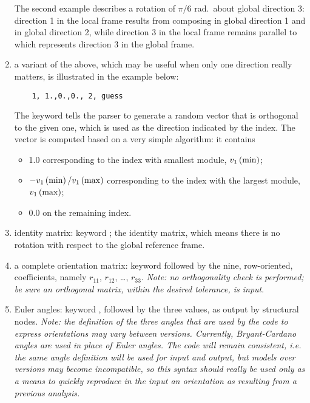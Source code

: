 \begin{enumerate}
    \noindent
    The second example describes a rotation of $ \pi/6 $ rad.\ about
    global direction 3: direction 1 in the local frame results from 
    composing  in global direction 1 and 
    in global direction 2, while direction 3 in the local frame remains
    parallel to  which represents direction 3 in the global
    frame.
    \item a variant of the above, which may be useful when only one
    direction really matters, is illustrated in the example below:
    \begin{verbatim}
    1, 1.,0.,0., 2, guess
    \end{verbatim}
    The keyword  tells the parser to generate a random vector
    that is orthogonal to the given one, which is used as the direction
    indicated by the index.
    The vector is computed based on a very simple algorithm: it contains
    \begin{itemize}
        \item 1.0 corresponding to the index with smallest module,
        $v_1\left( \mathrm{min} \right)$;
	\item $-v_1\left( \mathrm{min} \right)/v_1\left( \mathrm{max} \right)$
	corresponding to the index with the largest module,
	$v_1\left( \mathrm{max} \right)$;
	\item 0.0 on the remaining index.
    \end{itemize}
    \item identity matrix: keyword ; the identity matrix,
    which means there is no rotation with respect to the global reference
    frame.
    \item a complete orientation matrix: keyword 
    followed by the nine, row-oriented, coefficients, namely
    $ r_{11} $, $ r_{12} $, \ldots, $ r_{33} $.
    \emph{Note: no orthogonality check is performed; be sure an orthogonal
    matrix, within the desired tolerance, is input}.
    \item Euler angles: keyword , followed by the three
    values, as output by structural nodes.
    \emph{Note: the definition of the three angles that are used 
    by the code to express orientations may vary between versions.
    Currently, Bryant-Cardano angles are used in place of Euler
    angles.  The code will remain consistent, i.e. the same angle
    definition will be used for input and output, but models
    over versions may become incompatible, so this syntax should 
    really be used only as a means to quickly reproduce in the input
    an orientation as resulting from a previous analysis.}
\end{enumerate}

